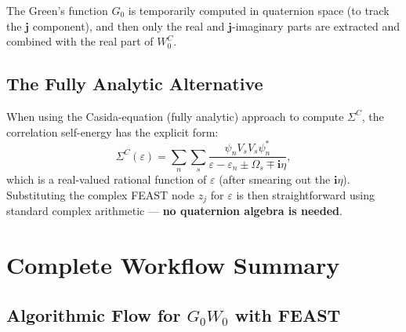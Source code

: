 \documentclass[12pt,a4paper]{article}
\theoremstyle{definition}
\begin{document}
The Green's function $G_0$ is temporarily computed in quaternion space (to track the $\mathbf{j}$ component), and then only the real and $\mathbf{j}$-imaginary parts are extracted and combined with the real part of $W_0^{C}$.

\subsection{The Fully Analytic Alternative}

When using the Casida-equation (fully analytic) approach to compute $\Sigma^{C}$, the correlation self-energy has the explicit form:
\begin{equation}\label{eq:analytic_sigma}
\Sigma^{C}(\varepsilon) = \sum_{n}\sum_{s} \frac{\psi_n V_s V_s \psi_n^{*}}{\varepsilon - \varepsilon_n \pm \Omega_s \mp \mathbf{i}\eta},
\end{equation}
which is a real-valued rational function of $\varepsilon$ (after smearing out the $\mathbf{i}\eta$). Substituting the complex FEAST node $z_j$ for $\varepsilon$ is then straightforward using standard complex arithmetic --- \textbf{no quaternion algebra is needed}.

\section{Complete Workflow Summary}

\subsection{Algorithmic Flow for $G_0W_0$ with FEAST}
\end{document}
